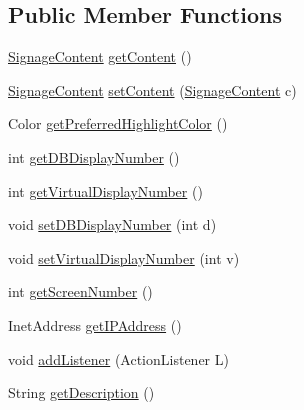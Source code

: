 \subsection*{Public Member Functions}
\begin{DoxyCompactItemize}
\item 
\hyperlink{interfacegov_1_1fnal_1_1ppd_1_1dd_1_1signage_1_1SignageContent}{Signage\-Content} \hyperlink{interfacegov_1_1fnal_1_1ppd_1_1dd_1_1signage_1_1Display_ab5979ea942bdd40fb9ea00375eccde78}{get\-Content} ()
\item 
\hyperlink{interfacegov_1_1fnal_1_1ppd_1_1dd_1_1signage_1_1SignageContent}{Signage\-Content} \hyperlink{interfacegov_1_1fnal_1_1ppd_1_1dd_1_1signage_1_1Display_a703f091805d557d9866d520a32d73929}{set\-Content} (\hyperlink{interfacegov_1_1fnal_1_1ppd_1_1dd_1_1signage_1_1SignageContent}{Signage\-Content} c)
\item 
Color \hyperlink{interfacegov_1_1fnal_1_1ppd_1_1dd_1_1signage_1_1Display_adc3c8118f22dd4d82c837da04a88723f}{get\-Preferred\-Highlight\-Color} ()
\item 
int \hyperlink{interfacegov_1_1fnal_1_1ppd_1_1dd_1_1signage_1_1Display_a16cd7303182205627ccffe5024e041d9}{get\-D\-B\-Display\-Number} ()
\item 
int \hyperlink{interfacegov_1_1fnal_1_1ppd_1_1dd_1_1signage_1_1Display_a5f3b01b971133b1278f6c80b1aed58e5}{get\-Virtual\-Display\-Number} ()
\item 
void \hyperlink{interfacegov_1_1fnal_1_1ppd_1_1dd_1_1signage_1_1Display_a97b825cca932ae53677073f95a0f93bd}{set\-D\-B\-Display\-Number} (int d)
\item 
void \hyperlink{interfacegov_1_1fnal_1_1ppd_1_1dd_1_1signage_1_1Display_a7c166488b81af34ad8c64868556ec38e}{set\-Virtual\-Display\-Number} (int v)
\item 
int \hyperlink{interfacegov_1_1fnal_1_1ppd_1_1dd_1_1signage_1_1Display_aebf42d7e0cbc3e6f0a4009bb61ddfdfb}{get\-Screen\-Number} ()
\item 
Inet\-Address \hyperlink{interfacegov_1_1fnal_1_1ppd_1_1dd_1_1signage_1_1Display_a0ddd8e7cd161e52c853bf4af8c1ae2bd}{get\-I\-P\-Address} ()
\item 
void \hyperlink{interfacegov_1_1fnal_1_1ppd_1_1dd_1_1signage_1_1Display_abbf3b133460808b9361107fcd5a3ae19}{add\-Listener} (Action\-Listener L)
\item 
String \hyperlink{interfacegov_1_1fnal_1_1ppd_1_1dd_1_1signage_1_1Display_afdd0f4294902140944f4aff8b8bc94d0}{get\-Description} ()
\item 

\end{DoxyCompactItemize}
